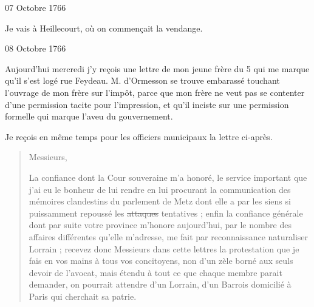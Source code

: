                     \begin{diary}{07 Octobre 1766}{}

                         Je vais à Heillecourt, où on commençait
                           la vendange. \bigskip


                     \end{diary}

                     \begin{diary}{08 Octobre 1766}{}

                         Aujourd'hui mercredi j’y reçois une
                           lettre
                           de mon jeune frère du
                              5 qui me marque qu’il
                           s’est logé rue Feydeau. M.
                              d’Ormesson se trouve
                           embarassé touchant l’ouvrage de mon
                              frère sur l’impôt, parce que mon frère
                           ne veut pas se contenter d’une permission
                           tacite pour l’impression, et qu’il inciste
                           sur une permission formelle qui marque
                           l’aveu du gouvernement. \bigskip


                         Je reçois en même temps pour les officiers
                           municipaux la lettre ci-après. \bigskip


                        \begin{quote}Messieurs,\bigskip


                              La confiance dont la Cour
                                 souveraine m’a honoré,
                              le service important que j’ai eu le bonheur de
                              lui rendre en lui procurant la communication
                              des mémoires clandestins du parlement de Metz
                              dont elle a par les siens si puissamment
                              repoussé les \sout{attaques}
                              tentatives ; enfin la
                              confiance générale dont par suite votre province m’honore aujourd'hui, par
                              le nombre
                              des affaires différentes qu’elle m’adresse, me fait
                              par reconnaissance naturaliser Lorrain ; recevez
                              donc Messieurs dans cette lettres la protestation
                              que je fais en vos mains à tous vos concitoyens,
                              non d’un zèle borné aux seuls devoir de l’avocat,
                              mais étendu à tout ce que chaque membre parait
                              demander, on pourrait attendre d’un Lorrain,
                              d’un Barrois domicilié à Paris qui cherchait
                              sa patrie. \bigskip



\end{quote}
\end{diary}
